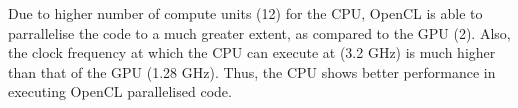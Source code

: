 Due to higher number of compute units (12) for the CPU, OpenCL is able to parrallelise the code to a much greater extent, as compared to the GPU (2). Also, the clock frequency at which the CPU can execute at (3.2 GHz) is much higher than that of  the GPU (1.28 GHz). Thus, the CPU shows better performance in executing OpenCL parallelised code.
